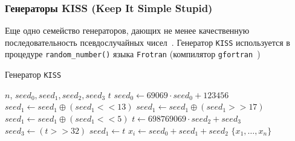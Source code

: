 \documentclass[%
floatfix,
showkeys,
nofootinbib, %
superscriptaddress, %
]{revtex4-1}
\begin{document}
\subsubsection{Генераторы KISS (Keep It Simple Stupid)}

Еще одно семейство генераторов, дающих не менее качественную
последовательность псевдослучайных чисел~\cite{L_KISS:2011}. Генератор
\texttt{KISS} используется в процедуре \texttt{random\_number()} языка
\texttt{Frotran} (компилятор \texttt{gfortran}~\cite{L_gfortran:2015})

\begin{minipage}[t]{0.5\textwidth}
        \vspace{-10pt}
        \begin{algorithm}[H]
                \begin{algorithmic}
                        \caption{Генератор \texttt{KISS}}\label{alg:kiss}
                        \Require $n$, $seed_{0},seed_{1},seed_{2},seed_{3}$
                        \State $t$
                                \State $seed_{0} \leftarrow 69069 \cdot seed_{0} + 123456$
                                \State $seed_{1} \leftarrow seed_{1} \oplus (seed_{1} << 13)$
                                \State $seed_{1} \leftarrow seed_{1} \oplus (seed_{1} >> 17)$
                                \State $seed_{1} \leftarrow seed_{1} \oplus (seed_{1} << 5)$
                                \State $t \leftarrow 698769069 \cdot seed_{2} + seed_{3}$
                                \State $seed_{3} \leftarrow (t >> 32)$
                                \State $seed_{1} \leftarrow t$
                                \State $x_{i} \leftarrow seed_{0} + seed_{1} + seed_{2}$
                        \EndFor
                        \State \Return $\{x_{1},\ldots,x_{n}\}$
                \end{algorithmic}
        \end{algorithm}
\end{minipage}
\end{document}
